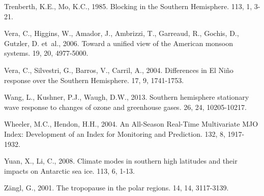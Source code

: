 \documentclass[spanish,a4paper,12pt]{book}
\begin{document}
\hypertarget{ref-Trenberth1985}{}
Trenberth, K.E., Mo, K.C., 1985. Blocking in the Southern Hemisphere.
113, 1, 3-21.

\hypertarget{ref-Vera2006}{}
Vera, C., Higgins, W., Amador, J., Ambrizzi, T., Garreaud, R., Gochis,
D., Gutzler, D. et~al., 2006. Toward a unified view of the American
monsoon systems. 19, 20, 4977-5000.

\hypertarget{ref-Vera2004}{}
Vera, C., Silvestri, G., Barros, V., Carril, A., 2004. Differences in El
Niño response over the Southern Hemisphere. 17, 9, 1741-1753.

\hypertarget{ref-Wang2013}{}
Wang, L., Kushner, P.J., Waugh, D.W., 2013. Southern hemisphere
stationary wave response to changes of ozone and greenhouse gases. 26,
24, 10205-10217.

\hypertarget{ref-Wheeler2004}{}
Wheeler, M.C., Hendon, H.H., 2004. An All-Season Real-Time Multivariate
MJO Index: Development of an Index for Monitoring and Prediction. 132,
8, 1917-1932.

\hypertarget{ref-Yuan2008}{}
Yuan, X., Li, C., 2008. Climate modes in southern high latitudes and
their impacts on Antarctic sea ice. 113, 6, 1-13.

\hypertarget{ref-Zangl2001}{}
Zängl, G., 2001. The tropopause in the polar regions. 14, 14, 3117-3139.
\end{document}

